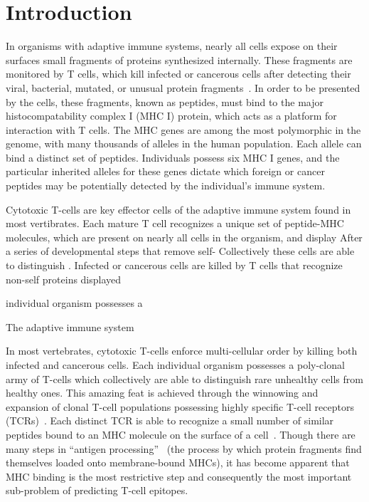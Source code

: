 \section{Introduction}
In organisms with adaptive immune systems, nearly all cells expose on their surfaces small fragments of proteins synthesized internally. These fragments are monitored by T cells, which kill infected or cancerous cells after detecting their viral, bacterial, mutated, or unusual protein fragments~\cite{Anderson_2004}. In order to be presented by the cells, these fragments, known as peptides, must bind to the major histocompatability complex I (MHC I) protein, which acts as a platform for interaction with T cells. The MHC genes are among the most polymorphic in the genome, with many thousands of alleles in the human population. Each allele can bind a distinct set of peptides. Individuals possess six MHC I genes, and the particular inherited alleles for these genes dictate which foreign or cancer peptides may be potentially detected by the individual's immune system.


Cytotoxic T-cells are key effector cells of the adaptive immune system found in most vertibrates. Each mature T cell recognizes a unique set of peptide-MHC molecules, which are present on nearly all cells in the organism, and display  After a series of developmental steps that remove self- Collectively these cells are able to distinguish . Infected or cancerous cells are killed by T cells that recognize non-self proteins displayed 

individual organism possesses a 

The adaptive immune system 

In most vertebrates, cytotoxic T-cells enforce multi-cellular order by killing both infected and cancerous cells. Each individual organism possesses a poly-clonal army of T-cells which collectively are able to distinguish rare unhealthy cells from healthy ones. This amazing feat is achieved through the winnowing and expansion of clonal T-cell populations possessing highly specific T-cell receptors (TCRs)~\cite{Blackman_1990}. Each distinct TCR is able to recognize a small number of similar peptides bound to an MHC molecule on the surface of a cell~\cite{Huseby_2005}. Though there are many steps in ``antigen processing''~\cite{Cresswell_2005} (the process by which protein fragments find themselves loaded onto membrane-bound MHCs), it has become apparent that MHC binding is the most restrictive step and consequently the most important sub-problem of predicting T-cell epitopes. 

